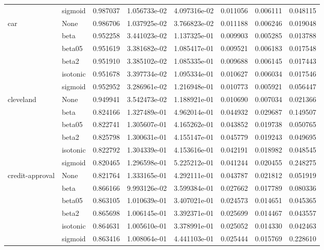\begin{tabular}{llrrrrrr}
        & sigmoid &  0.987037 &  1.056733e-02 &  4.097316e-02 &  0.011056 &  0.006111 &  0.048115 \\
car & None &  0.986706 &  1.037925e-02 &  3.766823e-02 &  0.011188 &  0.006246 &  0.019048 \\
        & beta &  0.952258 &  3.441023e-02 &  1.137325e-01 &  0.009903 &  0.005285 &  0.013788 \\
        & beta05 &  0.951619 &  3.381682e-02 &  1.085417e-01 &  0.009521 &  0.006183 &  0.017548 \\
        & beta2 &  0.951910 &  3.385102e-02 &  1.085335e-01 &  0.009688 &  0.006145 &  0.017443 \\
        & isotonic &  0.951678 &  3.397734e-02 &  1.095334e-01 &  0.010627 &  0.006034 &  0.017546 \\
        & sigmoid &  0.952952 &  3.286961e-02 &  1.216948e-01 &  0.010773 &  0.005921 &  0.056447 \\
cleveland & None &  0.949941 &  3.542473e-02 &  1.188921e-01 &  0.010690 &  0.007034 &  0.021366 \\
        & beta &  0.824166 &  1.327489e-01 &  4.962014e-01 &  0.044932 &  0.029687 &  0.149507 \\
        & beta05 &  0.822741 &  1.305607e-01 &  4.165262e-01 &  0.043852 &  0.019738 &  0.050765 \\
        & beta2 &  0.825798 &  1.300631e-01 &  4.155147e-01 &  0.045779 &  0.019243 &  0.049695 \\
        & isotonic &  0.822792 &  1.304339e-01 &  4.153616e-01 &  0.042191 &  0.018982 &  0.048545 \\
        & sigmoid &  0.820465 &  1.296598e-01 &  5.225212e-01 &  0.041244 &  0.020455 &  0.248275 \\
credit-approval & None &  0.821764 &  1.333165e-01 &  4.292111e-01 &  0.043787 &  0.021812 &  0.051919 \\
        & beta &  0.866166 &  9.993126e-02 &  3.599384e-01 &  0.027662 &  0.017789 &  0.080336 \\
        & beta05 &  0.863105 &  1.010639e-01 &  3.407021e-01 &  0.024573 &  0.014651 &  0.045365 \\
        & beta2 &  0.865698 &  1.006145e-01 &  3.392371e-01 &  0.025699 &  0.014467 &  0.043557 \\
        & isotonic &  0.864631 &  1.005610e-01 &  3.378991e-01 &  0.025052 &  0.014330 &  0.042463 \\
        & sigmoid &  0.863416 &  1.008064e-01 &  4.441103e-01 &  0.025444 &  0.015769 &  0.228610 \\

\end{tabular}
